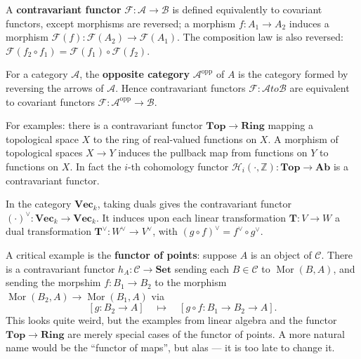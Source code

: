 \documentclass[11pt]{article}
\newcommand{\mat}[1]{\mathbf{#1}}
\newcommand{\Mor}{\operatorname{Mor}}
\newcommand{\A}{\mathscr{A}}
\newcommand{\B}{\mathscr{B}}
\newcommand{\C}{\mathscr{C}}
\newcommand{\F}{\mathcal{F}}
\begin{document}
A \textbf{contravariant functor} $\F : \A \to \B$ is defined equivalently to covariant functors, except morphisms are reversed; a morphism $f : A_{1} \to A_{2}$ induces a morphism $\F(f) : \F(A_{2}) \to \F(A_{1})$. The composition law is also reversed: $\F(f_{2} \circ f_{1}) = \F(f_{1}) \circ \F(f_{2})$.

For a category $\A$, the \textbf{opposite category} $\A^{\text{opp}}$ of $A$ is the category formed by reversing the arrows of $\A$. Hence contravariant functors $\F : \A to \B$ are equivalent to covariant functors $\F : \A^{\text{opp}} \to \B$.

\newpage

For examples: there is a contravariant functor $\mathbf{Top} \to \mathbf{Ring}$ mapping a topological space $X$ to the ring of real-valued functions on $X$. A morphism of topological spaces $X \to Y$ induces the pullback map from functions on $Y$ to functions on $X$. In fact the $i$-th cohomology functor $\mathcal{H}_{i}(\cdot, \mathbb{Z}) : \mathbf{Top} \to \mathbf{Ab}$ is a contravariant functor.

In the category $\mathbf{Vec}_{k}$, taking duals gives the contravariant functor $(\cdot)^{\vee} : \mathbf{Vec}_{k} \to \mathbf{Vec}_{k}$. It induces upon each linear transformation $\mat{T} : V \to W$ a dual transformation $\mat{T}^{\vee} : W^{\vee} \to V^{\vee}$, with $(g \circ f)^{\vee} = f^{\vee} \circ g^{\vee}$.

A critical example is the \textbf{functor of points}: suppose $A$ is an object of $\C$. There is a contravariant functor $h_{A} : \C \to \mathbf{Set}$ sending each $B \in \C$ to $\Mor(B, A)$, and sending the morpshim $f : B_{1} \to B_{2}$ to the morphism $\Mor(B_{2}, A) \to \Mor(B_{1}, A)$ via
\[
  [g : B_{2} \to A] \quad \mapsto \quad [g \circ f : B_{1} \to B_{2} \to A].
\]
This looks quite weird, but the examples from linear algebra and the functor $\mathbf{Top} \to \mathbf{Ring}$ are merely special cases of the functor of points. A more natural name would be the ``functor of maps'', but alas --- it is too late to change it.



\end{document}
